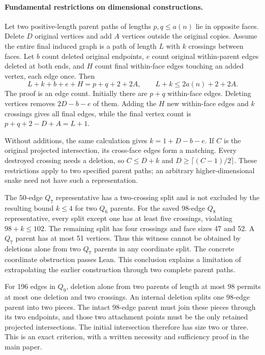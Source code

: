 \documentclass[11pt,a4paper]{article}
\begin{document}
\paragraph{Fundamental restrictions on dimensional constructions.}
Let two positive-length parent paths of lengths $p,q\le a(n)$ lie
in opposite faces. Delete $D$ original vertices and add $A$ vertices
outside the original copies. Assume the entire final induced graph is
a path of length $L$ with $k$ crossings between faces. Let $b$ count
deleted original endpoints, $e$ count original within-parent edges
deleted at both ends, and $H$ count final within-face edges touching
an added vertex, each edge once. Then
\[
\boxed{L+k+b+e+H=p+q+2+2A,\qquad L+k\le2a(n)+2+2A.}
\]
The proof is an edge count. Initially there are $p+q$ within-face
edges. Deleting vertices removes $2D-b-e$ of them. Adding the $H$
new within-face edges and $k$ crossings gives all final edges, while
the final vertex count is $p+q+2-D+A=L+1$.

Without additions, the same calculation gives $k=1+D-b-e$.
If $C$ is the original projected intersection, its cross-face edges
form a matching. Every destroyed crossing needs a deletion, so
$C\le D+k$ and $D\ge\lceil(C-1)/2\rceil$.
These restrictions apply to two specified parent paths; an arbitrary
higher-dimensional snake need not have such a representation.

The 50-edge $Q_7$ representative has a two-crossing split and is not
excluded by the resulting bound $k\le4$ for two $Q_6$ parents.
For the saved 98-edge $Q_8$ representative, every split except one
has at least five crossings, violating $98+k\le102$.
The remaining split has four crossings and face sizes 47 and 52.
A $Q_7$ parent has at most 51 vertices. Thus this witness cannot
be obtained by deletions alone from two $Q_7$ parents in any
coordinate split. The concrete coordinate obstruction passes Lean.
This conclusion explains a limitation of extrapolating the earlier
construction through two complete parent paths.

For 196 edges in $Q_9$, deletion alone from two parents of length
at most 98 permits at most one deletion and two crossings.
An internal deletion splits one 98-edge parent into two pieces.
The intact 98-edge parent must join these pieces through its two
endpoints, and those two attachment points must be the only retained
projected intersections. The initial intersection therefore has size
two or three. This is an exact criterion, with a written necessity
and sufficiency proof in the main paper.
\end{document}
